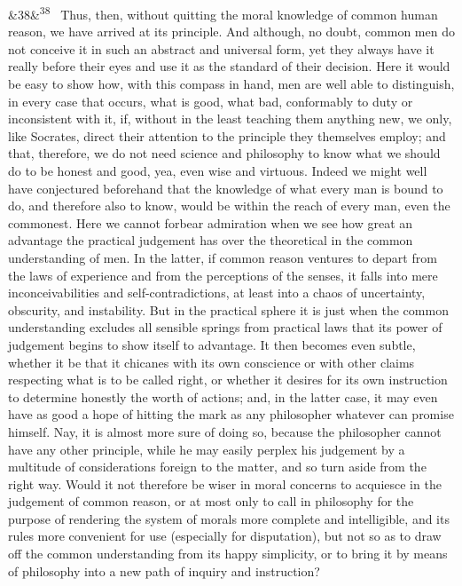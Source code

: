 \documentclass[12pt]{article}
\newcommand{\para}[1][]{\par\noindent\ifx&#1&\else\textsuperscript{\footnotesize #1}~\fi}
\begin{document}
\para[38] Thus, then, without quitting the moral knowledge of common human reason, we have arrived at its principle. And although, no doubt, common men do not conceive it in such an abstract and universal form, yet they always have it really before their eyes and use it as the standard of their decision. Here it would be easy to show how, with this compass in hand, men are well able to distinguish, in every case that occurs, what is good, what bad, conformably to duty or inconsistent with it, if, without in the least teaching them anything new, we only, like Socrates, direct their attention to the principle they themselves employ; and that, therefore, we do not need science and philosophy to know what we should do to be honest and good, yea, even wise and virtuous. Indeed we might well have conjectured beforehand that the knowledge of what every man is bound to do, and therefore also to know, would be within the reach of every man, even the commonest. Here we cannot forbear admiration when we see how great an advantage the practical judgement has over the theoretical in the common understanding of men. In the latter, if common reason ventures to depart from the laws of experience and from the perceptions of the senses, it falls into mere inconceivabilities and self-contradictions, at least into a chaos of uncertainty, obscurity, and instability. But in the practical sphere it is just when the common understanding excludes all sensible springs from practical laws that its power of judgement begins to show itself to advantage. It then becomes even subtle, whether it be that it chicanes with its own conscience or with other claims respecting what is to be called right, or whether it desires for its own instruction to determine honestly the worth of actions; and, in the latter case, it may even have as good a hope of hitting the mark as any philosopher whatever can promise himself. Nay, it is almost more sure of doing so, because the philosopher cannot have any other principle, while he may easily perplex his judgement by a multitude of considerations foreign to the matter, and so turn aside from the right way. Would it not therefore be wiser in moral concerns to acquiesce in the judgement of common reason, or at most only to call in philosophy for the purpose of rendering the system of morals more complete and intelligible, and its rules more convenient for use (especially for disputation), but not so as to draw off the common understanding from its happy simplicity, or to bring it by means of philosophy into a new path of inquiry and instruction?
\end{document}
